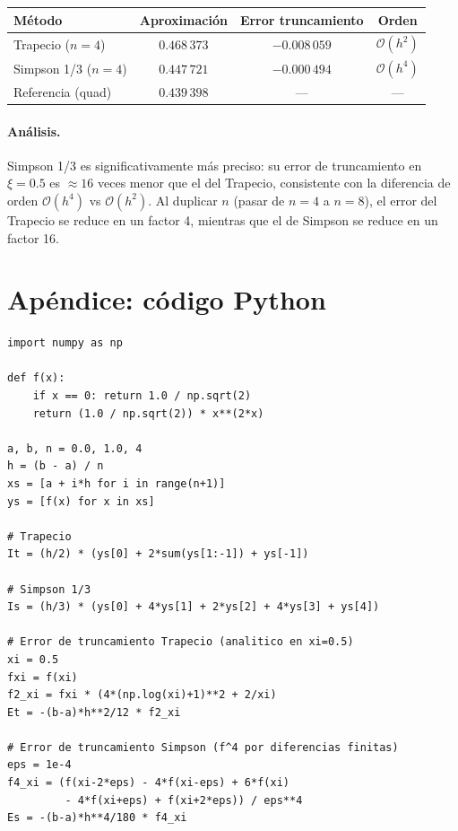 \documentclass[12pt,a4paper]{article}
\begin{document}
\begin{center}
\renewcommand{\arraystretch}{1.3}
\begin{tabular}{lccc}
\toprule
\textbf{M\'etodo} & \textbf{Aproximaci\'on} & \textbf{Error truncamiento} & \textbf{Orden} \\
\midrule
Trapecio ($n=4$)    & $0.468\,373$ & $-0.008\,059$ & $\mathcal{O}(h^2)$ \\
Simpson 1/3 ($n=4$) & $0.447\,721$ & $-0.000\,494$ & $\mathcal{O}(h^4)$ \\
Referencia (quad)   & $0.439\,398$ & ---           & --- \\
\bottomrule
\end{tabular}
\end{center}

\paragraph{An\'alisis.}
Simpson 1/3 es significativamente m\'as preciso: su error de truncamiento en
$\xi=0.5$ es $\approx 16$ veces menor que el del Trapecio, consistente con la
diferencia de orden $\mathcal{O}(h^4)$ vs $\mathcal{O}(h^2)$.
Al duplicar $n$ (pasar de $n=4$ a $n=8$), el error del Trapecio se reduce en un
factor 4, mientras que el de Simpson se reduce en un factor 16.

\section*{Ap\'endice: c\'odigo Python}

\begin{lstlisting}[caption={Integración numérica con Trapecio y Simpson 1/3}]
import numpy as np

def f(x):
    if x == 0: return 1.0 / np.sqrt(2)
    return (1.0 / np.sqrt(2)) * x**(2*x)

a, b, n = 0.0, 1.0, 4
h = (b - a) / n
xs = [a + i*h for i in range(n+1)]
ys = [f(x) for x in xs]

# Trapecio
It = (h/2) * (ys[0] + 2*sum(ys[1:-1]) + ys[-1])

# Simpson 1/3
Is = (h/3) * (ys[0] + 4*ys[1] + 2*ys[2] + 4*ys[3] + ys[4])

# Error de truncamiento Trapecio (analitico en xi=0.5)
xi = 0.5
fxi = f(xi)
f2_xi = fxi * (4*(np.log(xi)+1)**2 + 2/xi)
Et = -(b-a)*h**2/12 * f2_xi

# Error de truncamiento Simpson (f^4 por diferencias finitas)
eps = 1e-4
f4_xi = (f(xi-2*eps) - 4*f(xi-eps) + 6*f(xi)
         - 4*f(xi+eps) + f(xi+2*eps)) / eps**4
Es = -(b-a)*h**4/180 * f4_xi
\end{lstlisting}
\end{document}
